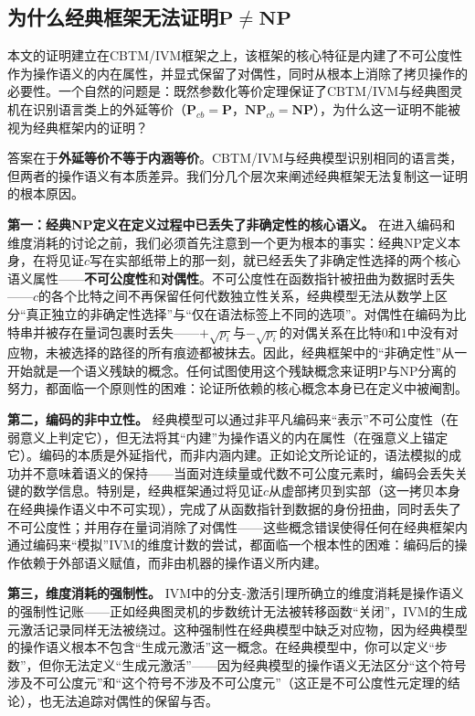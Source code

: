 \documentclass{ctexart}
\begin{document}
	\subsection{为什么经典框架无法证明$\mathbf{P} \neq \mathbf{NP}$}
	
	本文的证明建立在CBTM/IVM框架之上，该框架的核心特征是内建了不可公度性作为操作语义的内在属性，并显式保留了对偶性，同时从根本上消除了拷贝操作的必要性。一个自然的问题是：既然参数化等价定理保证了CBTM/IVM与经典图灵机在识别语言类上的外延等价（$\mathbf{P}_{cb}=\mathbf{P}$，$\mathbf{NP}_{cb}=\mathbf{NP}$），为什么这一证明不能被视为经典框架内的证明？
	
	答案在于\textbf{外延等价不等于内涵等价}。CBTM/IVM与经典模型识别相同的语言类，但两者的操作语义有本质差异。我们分几个层次来阐述经典框架无法复制这一证明的根本原因。
	
	\textbf{第一：经典NP定义在定义过程中已丢失了非确定性的核心语义。} 在进入编码和维度消耗的讨论之前，我们必须首先注意到一个更为根本的事实：经典NP定义本身，在将见证$c$写在实部纸带上的那一刻，就已经丢失了非确定性选择的两个核心语义属性——\textbf{不可公度性}和\textbf{对偶性}。不可公度性在函数指针被扭曲为数据时丢失——$c$的各个比特之间不再保留任何代数独立性关系，经典模型无法从数学上区分``真正独立的非确定性选择''与``仅在语法标签上不同的选项''。对偶性在编码为比特串并被存在量词包裹时丢失——$+\sqrt{p_i}$与$-\sqrt{p_i}$的对偶关系在比特$0$和$1$中没有对应物，未被选择的路径的所有痕迹都被抹去。因此，经典框架中的``非确定性''从一开始就是一个语义残缺的概念。任何试图使用这个残缺概念来证明P与NP分离的努力，都面临一个原则性的困难：论证所依赖的核心概念本身已在定义中被阉割。
	
	\textbf{第二，编码的非中立性。} 经典模型可以通过非平凡编码来``表示''不可公度性（在弱意义上判定它），但无法将其``内建''为操作语义的内在属性（在强意义上锚定它）。编码的本质是外延指代，而非内涵内建。正如论文\cite{models2026}所论证的，语法模拟的成功并不意味着语义的保持——当面对连续量或代数不可公度元素时，编码会丢失关键的数学信息。特别是，经典框架通过将见证$c$从虚部拷贝到实部（这一拷贝本身在经典操作语义中不可实现），完成了从函数指针到数据的身份扭曲，同时丢失了不可公度性；并用存在量词消除了对偶性——这些概念错误使得任何在经典框架内通过编码来``模拟''IVM的维度计数的尝试，都面临一个根本性的困难：编码后的操作依赖于外部语义赋值，而非由机器的操作语义所内建。
	
	\textbf{第三，维度消耗的强制性。} IVM中的分支-激活引理所确立的维度消耗是操作语义的强制性记账——正如经典图灵机的步数统计无法被转移函数``关闭''，IVM的生成元激活记录同样无法被绕过。这种强制性在经典模型中缺乏对应物，因为经典模型的操作语义根本不包含``生成元激活''这一概念。在经典模型中，你可以定义``步数''，但你无法定义``生成元激活''——因为经典模型的操作语义无法区分``这个符号涉及不可公度元''和``这个符号不涉及不可公度元''（这正是不可公度性元定理的结论），也无法追踪对偶性的保留与否。
	
\end{document}
